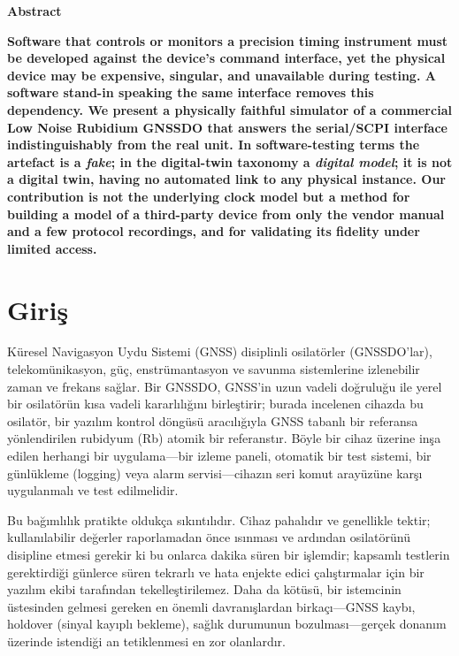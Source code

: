 \documentclass[9pt,twocolumn,a4paper]{extarticle}
\begin{document}
\begin{center}
    {\fontsize{10}{12}\selectfont\bfseries Abstract \par}
\end{center}
\vspace{-0.5em}
\noindent \textbf{Software that controls or monitors a precision timing instrument must be developed against the device's command interface, yet the physical device may be expensive, singular, and unavailable during testing. A software stand-in speaking the same interface removes this dependency. We present a physically faithful simulator of a commercial Low Noise Rubidium GNSSDO that answers the serial/SCPI interface indistinguishably from the real unit. In software-testing terms the artefact is a \textit{fake}; in the digital-twin taxonomy a \textit{digital model}; it is not a digital twin, having no automated link to any physical instance. Our contribution is not the underlying clock model but a method for building a model of a third-party device from only the vendor manual and a few protocol recordings, and for validating its fidelity under limited access.}

\section{Giriş}
Küresel Navigasyon Uydu Sistemi (GNSS) disiplinli osilatörler (GNSSDO'lar), telekomünikasyon, güç, enstrümantasyon ve savunma sistemlerine izlenebilir zaman ve frekans sağlar. Bir GNSSDO, GNSS'in uzun vadeli doğruluğu ile yerel bir osilatörün kısa vadeli kararlılığını birleştirir; burada incelenen cihazda bu osilatör, bir yazılım kontrol döngüsü aracılığıyla GNSS tabanlı bir referansa yönlendirilen rubidyum (Rb) atomik bir referanstır. Böyle bir cihaz üzerine inşa edilen herhangi bir uygulama---bir izleme paneli, otomatik bir test sistemi, bir günlükleme (logging) veya alarm servisi---cihazın seri komut arayüzüne karşı uygulanmalı ve test edilmelidir.

Bu bağımlılık pratikte oldukça sıkıntılıdır. Cihaz pahalıdır ve genellikle tektir; kullanılabilir değerler raporlamadan önce ısınması ve ardından osilatörünü disipline etmesi gerekir ki bu onlarca dakika süren bir işlemdir; kapsamlı testlerin gerektirdiği günlerce süren tekrarlı ve hata enjekte edici çalıştırmalar için bir yazılım ekibi tarafından tekelleştirilemez. Daha da kötüsü, bir istemcinin üstesinden gelmesi gereken en önemli davranışlardan birkaçı---GNSS kaybı, holdover (sinyal kayıplı bekleme), sağlık durumunun bozulması---gerçek donanım üzerinde istendiği an tetiklenmesi en zor olanlardır.
\end{document}
